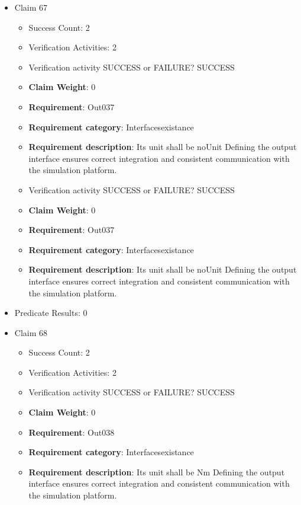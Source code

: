 \documentclass{article}
\begin{document}
\begin{itemize}
  				  \item Claim 67
				\begin{itemize}
			    	\item Success Count: 2 
			    	\item Verification Activities: 2
					\item Verification activity SUCCESS or FAILURE? SUCCESS
					\item \textbf{Claim Weight}: 0
						\item \textbf{Requirement}: Out037 
						\item \textbf{Requirement category}: Interfacesexistance 
						\item \textbf{Requirement description}: Its unit shall be noUnit Defining the output interface ensures correct integration and consistent communication with the simulation platform.
					
					\item Verification activity SUCCESS or FAILURE? SUCCESS
					\item \textbf{Claim Weight}: 0
						\item \textbf{Requirement}: Out037 
						\item \textbf{Requirement category}: Interfacesexistance 
						\item \textbf{Requirement description}: Its unit shall be noUnit Defining the output interface ensures correct integration and consistent communication with the simulation platform.
					
				\end{itemize}
				
									    
				\item Predicate Results: 0

  				  \item Claim 68
				\begin{itemize}
			    	\item Success Count: 2 
			    	\item Verification Activities: 2
					\item Verification activity SUCCESS or FAILURE? SUCCESS
					\item \textbf{Claim Weight}: 0
						\item \textbf{Requirement}: Out038 
						\item \textbf{Requirement category}: Interfacesexistance 
						\item \textbf{Requirement description}: Its unit shall be Nm Defining the output interface ensures correct integration and consistent communication with the simulation platform.
					

\end{itemize}
\end{itemize}
\end{document}
